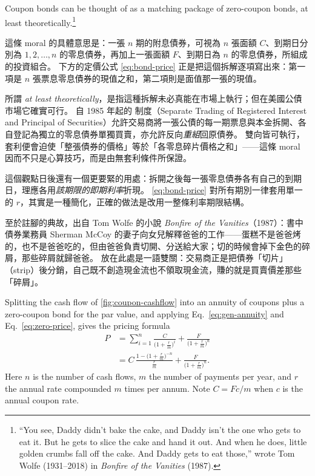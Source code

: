\begin{moral}
	Coupon bonds can be thought of as a matching package of zero-coupon bonds, at least theoretically.\footnote{``You see, Daddy didn't bake the cake, and Daddy isn't the one who gets to eat it.
	But he gets to slice the cake and hand it out.
	And when he does, little golden crumbs fall off the cake.
	And Daddy gets to eat those,'' wrote Tom Wolfe (1931--2018) in \emph{Bonfire of the Vanities} (1987).}
\end{moral}

\suppstart
\begin{remark}
	這條 moral 的具體意思是：一張 $n$ 期的附息債券，可視為 $n$ 張面額 $C$、到期日分別為 $1, 2, \ldots, n$ 的零息債券，再加上一張面額 $F$、到期日為 $n$ 的零息債券，所組成的投資組合。
	下方的定價公式 \eqref{eq:bond-price} 正是把這個拆解逐項寫出來：第一項是 $n$ 張票息零息債券的現值之和，第二項則是面值那一張的現值。

	所謂 \emph{at least theoretically}，是指這種拆解未必真能在市場上執行；但在美國公債市場它確實可行。
	自 1985 年起的  制度（Separate Trading of Registered Interest and Principal of Securities）允許交易商將一張公債的每一期票息與本金拆開、各自登記為獨立的零息債券單獨買賣，亦允許反向\emph{重組}回原債券。
	雙向皆可執行，套利便會迫使「整張債券的價格」等於「各零息碎片價格之和」——這條 moral 因而不只是心算技巧，而是由無套利條件所保證。

	這個觀點日後還有一個更要緊的用處：拆開之後每一張零息債券各有自己的到期日，理應各用\emph{該期限的即期利率}折現。
	\eqref{eq:bond-price} 對所有期別一律套用單一的 $r$，其實是一種簡化，正確的做法是改用一整條利率期限結構。

	至於註腳的典故，出自 Tom Wolfe 的小說 \emph{Bonfire of the Vanities}（1987）：書中債券業務員 Sherman McCoy 的妻子向女兒解釋爸爸的工作——蛋糕不是爸爸烤的，也不是爸爸吃的，但由爸爸負責切開、分送給大家；切的時候會掉下金色的碎屑，那些碎屑就歸爸爸。
	放在此處是一語雙關：交易商正是把債券「切片」（strip）後分銷，自己既不創造現金流也不領取現金流，賺的就是買賣價差那些「碎屑」。
\end{remark}
\suppend

Splitting the cash flow of \autoref{fig:coupon-cashflow} into an annuity of coupons plus a zero-coupon bond for the par value, and applying Eq.~\eqref{eq:gen-annuity} and Eq.~\eqref{eq:zero-price}, gives the pricing formula
\begin{align}
	P & = \sum_{i=1}^{n} \frac{C}{\bigl(1+\frac{r}{m}\bigr)^{i}}
	+ \frac{F}{\bigl(1+\frac{r}{m}\bigr)^{n}} \nonumber                          \\
	  & = C\,\frac{1-\bigl(1+\frac{r}{m}\bigr)^{-n}}{\frac{r}{m}}
	+ \frac{F}{\bigl(1+\frac{r}{m}\bigr)^{n}} . \label{eq:bond-price}
\end{align}
Here $n$ is the number of cash flows, $m$ the number of payments per year, and $r$ the annual rate compounded $m$ times per annum.
Note $C = Fc/m$ when $c$ is the annual coupon rate.


